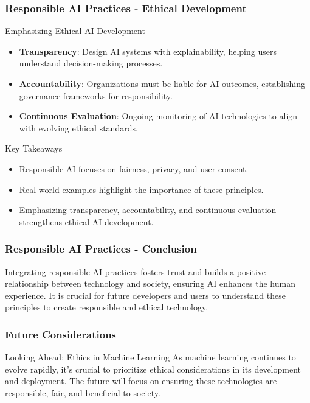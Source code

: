 \documentclass[aspectratio=169]{beamer}
\begin{document}
\begin{frame}[fragile]
    \frametitle{Responsible AI Practices - Ethical Development}
    \begin{block}{Emphasizing Ethical AI Development}
        \begin{itemize}
            \item \textbf{Transparency}: Design AI systems with explainability, helping users understand decision-making processes.
            \item \textbf{Accountability}: Organizations must be liable for AI outcomes, establishing governance frameworks for responsibility.
            \item \textbf{Continuous Evaluation}: Ongoing monitoring of AI technologies to align with evolving ethical standards.
        \end{itemize}
    \end{block}
    
    \begin{block}{Key Takeaways}
        \begin{itemize}
            \item Responsible AI focuses on fairness, privacy, and user consent.
            \item Real-world examples highlight the importance of these principles.
            \item Emphasizing transparency, accountability, and continuous evaluation strengthens ethical AI development.
        \end{itemize}
    \end{block}
\end{frame}

\begin{frame}[fragile]
    \frametitle{Responsible AI Practices - Conclusion}
    Integrating responsible AI practices fosters trust and builds a positive relationship between technology and society, ensuring AI enhances the human experience. It is crucial for future developers and users to understand these principles to create responsible and ethical technology.
\end{frame}

\begin{frame}[fragile]
    \frametitle{Future Considerations}
    \begin{block}{Looking Ahead: Ethics in Machine Learning}
        As machine learning continues to evolve rapidly, it's crucial to prioritize ethical considerations in its development and deployment. 
        The future will focus on ensuring these technologies are responsible, fair, and beneficial to society.
    \end{block}
\end{frame}
\end{document}
